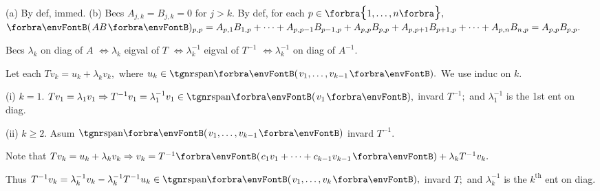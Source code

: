 \ChEnd

\pagebreak



\vspace{4pt}

(a) By def, immed. \:(b) Becs $A_{j,k}=B_{j,k}=0$ for $j>k.$ By def, for each $p\in\Bra{1,\dots,n},$\parSol{} $\Par{AB}{_{p,p}}=A_{p,1}B_{1,p}+\dots+A_{p,p-1}B_{p-1,p}+A_{p,p}B_{p,p}+A_{p,p+1}B_{p+1,p}+\dots+A_{p,n}B_{n,p}=A_{p,p}B_{p,p}.$\PfEnd
\SepLine

Becs $\lambda_k$ on diag of $A$ $\Longleftrightarrow\lambda_k$ eigval of $T$ $\Longleftrightarrow\lambda_k^{-1}$ eigval of $T^{-1}$ $\Longleftrightarrow\lambda_k^{-1}$ on diag of $A^{-1}.$\PfEnd\vspace{2pt}\par\quad
\Or Let each $Tv_k=u_k+\lambda_kv_k,$ where $u_k\in\Span{v_1,\dots,v_{k-1}}.$ We use induc on $k.$\par\quad
(i) $k=1.$ $Tv_1=\lambda_1v_1\Rightarrow T^{-1}v_1=\lambda_1^{-1}v_1\in\Span{v_1},$ invard $T^{-1};$ and $\lambda_1^{-1}$ is the 1st ent on diag.\par\quad\Endi
(ii) $k\geqslant 2.$ Asum $\Span{v_1,\dots,v_{k-1}}$ invard $T^{-1}.$\par\quad\Hii
Note that $Tv_k=u_k+\lambda_kv_k\Rightarrow v_k=T^{-1}\Par{c_1v_1+\dots+c_{k-1}v_{k-1}}+\lambda_kT^{-1}v_k.$\par\quad\Hii
Thus $T^{-1}v_k=\lambda_k^{-1}v_k-\lambda_k^{-1}T^{-1}u_k\in\Span{v_1,\dots,v_k},$ invard $T;$ and $\lambda_{k}^{-1}$ is the $k^\text{th}$ ent on diag.\PfEnd
\SepLine

